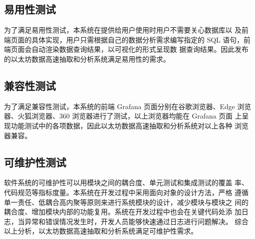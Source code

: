 \subsection{易用性测试}

为了满足易用性测试，本系统在提供给用户使用时用户不需要关心数据库以
及前端页面的具体实现，用户只需根据自己的数据分析需求编写指定的
SQL 语句，前端页面会自动渲染数据查询结果，以可视化的形式呈现数
据查询结果。因此发布的以太坊数据高速抽取和分析系统满足易用性的需求。

\subsection{兼容性测试}

为了满足兼容性测试，本系统的前端 Grafana 页面分别在谷歌浏览器、Edge
浏览器、火狐浏览器、360 浏览器进行了测试，以上浏览器均能在 Grafana 页面
上呈现功能测试中的各项数据，因此以太坊数据高速抽取和分析系统对以上各种
浏览器兼容。

\subsection{可维护性测试}

软件系统的可维护性可以用模块之间的耦合度、单元测试和集成测试的覆盖
率、代码规范等指标度量。本系统在开发过程中采用面向对象的设计方法，严格
遵循单一责任、低耦合高内聚等原则来进行系统模块的设计，减少模块与模块之
间的耦合度、增加模块内部的功能复用。系统在开发过程中也会在关键代码处添
加日志，当异常和错误情况发生时，开发人员能够快速通过日志进行问题解决。
综合以上分析，以太坊数据高速抽取和分析系统满足可维护性需求。

